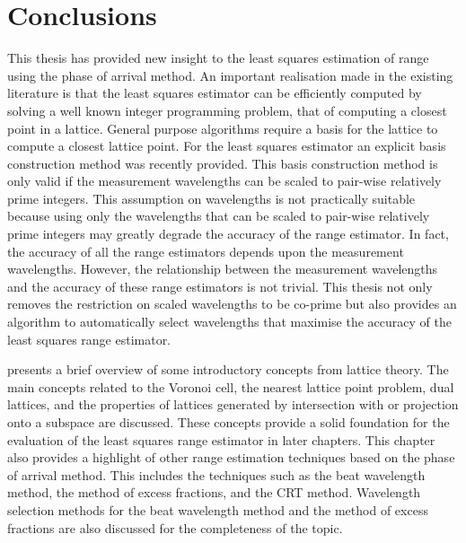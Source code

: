 \label{Chapter6}

\section{Conclusions}
This thesis has provided new insight to the least squares estimation of range using the phase of arrival method. An important realisation made in the existing literature is that the least squares estimator can be efficiently computed by solving a well known integer programming problem, that of computing a closest point in a lattice. General purpose algorithms require a basis for the lattice to compute a closest lattice point. For the least squares estimator an explicit basis construction method was recently provided. This basis construction method is only valid if the measurement wavelengths can be scaled to pair-wise relatively prime integers. This assumption on wavelengths is not practically suitable because using only the wavelengths that can be scaled to pair-wise relatively prime integers may greatly degrade the accuracy of the range estimator. In fact, the accuracy of all the range estimators depends upon the measurement wavelengths. However, the relationship between the measurement wavelengths and the accuracy of these range estimators is not trivial. This thesis not only removes the restriction on scaled wavelengths to be co-prime but also provides an algorithm to automatically select wavelengths that maximise the accuracy of the least squares range estimator.

%

 presents a brief overview of some introductory concepts from lattice theory. The main concepts related to the Voronoi cell, the nearest lattice point problem, dual lattices, and the properties of lattices generated by intersection with or projection onto a subspace are discussed. These concepts provide a solid foundation for the evaluation of the least squares range estimator in later chapters. This chapter also provides a highlight of other range estimation techniques based on the phase of arrival method. This includes the techniques such as the beat wavelength method, the method of excess fractions, and the CRT method. Wavelength selection methods for the beat wavelength method and the method of excess fractions are also discussed for the completeness of the topic.

